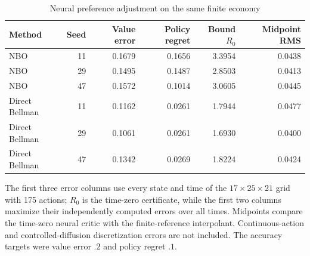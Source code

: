 \begin{table}[t]\centering
\caption{Neural preference adjustment on the same finite economy}\label{tab:ndu-r6}
\small\begin{tabular}{lrrrrr}
\toprule
Method & Seed & Value error & Policy regret & Bound $R_0$ & Midpoint RMS\\\midrule
NBO & 11 & 0.1679 & 0.1656 & 3.3954 & 0.0438\\
NBO & 29 & 0.1495 & 0.1487 & 2.8503 & 0.0413\\
NBO & 47 & 0.1572 & 0.1014 & 3.0605 & 0.0445\\
Direct Bellman & 11 & 0.1162 & 0.0261 & 1.7944 & 0.0477\\
Direct Bellman & 29 & 0.1061 & 0.0261 & 1.6930 & 0.0400\\
Direct Bellman & 47 & 0.1342 & 0.0269 & 1.8224 & 0.0424\\
\bottomrule\end{tabular}
\par\smallskip\footnotesize The first three error columns use every state and time of the $17\times25\times21$ grid with 175 actions; $R_0$ is the time-zero certificate, while the first two columns maximize their independently computed errors over all times. Midpoints compare the time-zero neural critic with the finite-reference interpolant. Continuous-action and controlled-diffusion discretization errors are not included. The accuracy targets were value error $.2$ and policy regret $.1$.
\end{table}
